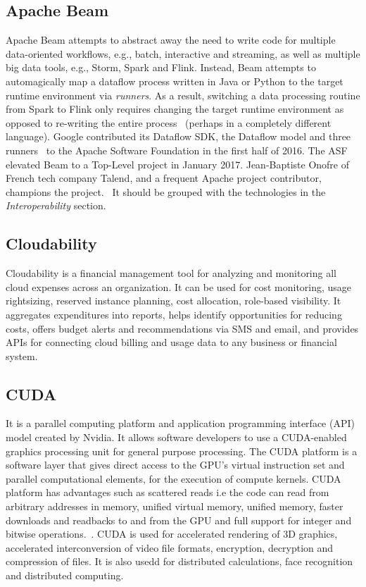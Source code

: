 \subsection{Apache Beam \cv}

Apache Beam attempts to abstract away the need to write code for
multiple data-oriented workflows, e.g., batch, interactive and
streaming, as well as multiple big data tools, e.g., Storm, Spark and
Flink.  Instead, Beam attempts to automagically map a dataflow process
written in Java or Python to the target runtime environment via
\textit{runners}.  As a result, switching a data processing routine from
Spark to Flink only requires changing the target runtime environment
as opposed to re-writing the entire
process~\cite{www-infoworld-apachebeam} (perhaps in a completely
different language).  Google contributed its Dataflow SDK, the
Dataflow model and three runners~\cite{www-datanami-apachebeam} to the
Apache Software Foundation in the first half of 2016.  The ASF
elevated Beam to a Top-Level project in January 2017.  Jean-Baptiste
Onofre of French tech company Talend, and a frequent Apache project
contributor, champions the project.~\cite{www-talend-apachebeam} It
should be grouped with the technologies in the \textit{Interoperability}
section.

\subsection{Cloudability \cv}

Cloudability is a financial management tool for analyzing and
monitoring all cloud expenses across an organization. It can be used
for cost monitoring, usage rightsizing, reserved instance planning,
cost allocation, role-based visibility. It aggregates expenditures
into reports, helps identify opportunities for reducing costs, offers
budget alerts and recommendations via SMS and email, and provides APIs
for connecting cloud billing and usage data to any business or
financial system.~\cite{www-cloudability}



\subsection{CUDA \cv}

It is a parallel computing platform and application programming
interface (API) model created by Nvidia. It allows software developers
to use a CUDA-enabled graphics processing unit for general purpose
processing. The CUDA platform is a software layer that gives direct
access to the GPU's virtual instruction set and parallel computational
elements, for the execution of compute kernels.  CUDA platform has
advantages such as scattered reads i.e the code can read from
arbitrary addresses in memory, unified virtual memory, unified memory,
faster downloads and readbacks to and from the GPU and full support
for integer and bitwise operations.~\cite{www-cuda-wikipedia}.  CUDA
is used for accelerated rendering of 3D graphics, accelerated
interconversion of video file formats, encryption, decryption and
compression of files.  It is also usedd for distributed calculations,
face recognition and distributed computing.~\cite{www-cuda-wikipedia}
	  

